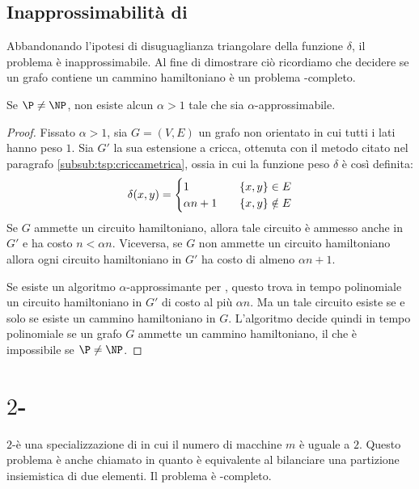 \subsection{Inapprossimabilità di \TravelingSalesman}
Abbandonando l'ipotesi di disuguaglianza triangolare della funzione $\delta$, il problema \TravelingSalesman è inapprossimabile.
Al fine di dimostrare ciò ricordiamo che decidere se un grafo contiene un cammino hamiltoniano è un problema \NP-completo.

\begin{theorem}
	Se $\P\neq\NP$, non esiste alcun $\alpha>1$ tale che \TravelingSalesman sia $\alpha$-approssimabile.
\end{theorem}
\begin{proof}
	Fissato $\alpha>1$, sia $G=(V,E)$ un grafo non orientato in cui tutti i lati hanno peso $1$.
	Sia $G'$ la sua estensione a cricca, ottenuta con il metodo citato nel paragrafo \ref{subsub:tsp:criccametrica}, ossia in cui la funzione peso $\delta$ è così definita:
	\begin{equation*}
		\delta(x,y) = \begin{cases}
			1          & \quad \left\{ x,y \right\}\in E    \\
			\alpha n+1 & \quad \left\{ x,y \right\}\notin E
		\end{cases}
	\end{equation*}
	Se $G$ ammette un circuito hamiltoniano, allora tale circuito è ammesso anche in $G'$ e ha costo $n<\alpha n$.
	Viceversa, se $G$ non ammette un circuito hamiltoniano allora ogni circuito hamiltoniano in $G'$ ha costo di almeno $\alpha n+1$.

	Se esiste un algoritmo $\alpha$-approssimante per \TravelingSalesman, questo trova in tempo polinomiale un circuito hamiltoniano in $G'$ di costo al più $\alpha n$. Ma un tale circuito esiste se e solo se esiste un cammino hamiltoniano in $G$. L'algoritmo decide quindi in tempo polinomiale se un grafo $G$ ammette un cammino hamiltoniano, il che è impossibile se $\P\neq\NP$.
\end{proof}



\section{\texorpdfstring{$2$}{2}-\LoadBalancing}
$2$-\LoadBalancing è una specializzazione di \LoadBalancing in cui il numero di macchine $m$ è uguale a $2$.
Questo problema è anche chiamato \MinimumPartition in quanto è equivalente al bilanciare una partizione insiemistica di due elementi.
Il problema è \NPO-completo.

